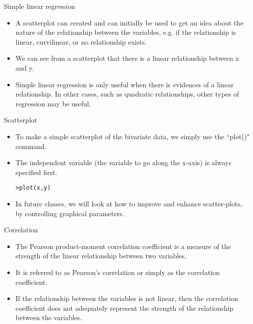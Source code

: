 \documentclass[pdf,default,slideColor,colorBG]{prosper}
\begin{document}
\begin{slide}{Simple linear regression}
\begin{itemize}

\item A scatterplot can created and can initially be used to get an idea
about the nature of the relationship between the variables, e.g. if
the relationship is linear, curvilinear, or no relationship exists.

\item We can see from a scatterplot that there is a linear relationship
between x and y.

\item Simple linear regression is only useful when there is evidences of a linear relationship.
In other cases, such as quadratic relationships, other types of regression may be useful.

\end{itemize}
\end{slide}

\begin{slide}{Scatterplot}
\begin{itemize}
\item To make a simple scatterplot of the bivariate data, we simply use the
``plot()" command. \item The independent variable (the variable to go along the x-axis) is always specified first.
\begin{verbatim}
>plot(x,y)
\end{verbatim}
\item In future classes, we will look at how to improve and enhance scatter-plots, by controlling graphical parameters.
\end{itemize}
\end{slide}

\begin{slide}{Correlation}
\begin{itemize}

\item The Pearson product-moment correlation coefficient is a measure of the strength of the linear relationship between two variables. \item  It is referred to as Pearson's correlation or simply as the correlation coefficient. \item If the relationship between the variables is not linear, then the correlation coefficient does not adequately represent the strength of the relationship between the variables.
\end{itemize}
\end{slide}
\end{document}
